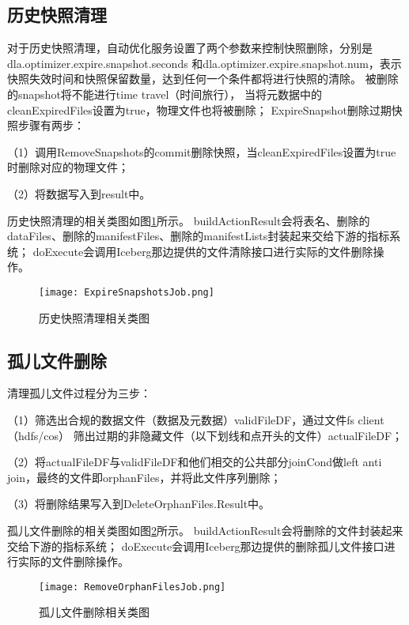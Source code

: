 \subsection{历史快照清理}

对于历史快照清理，自动优化服务设置了两个参数来控制快照删除，分别是dla.optimizer.expire.snapshot.seconds
和dla.optimizer.expire.snapshot.num，表示快照失效时间和快照保留数量，达到任何一个条件都将进行快照的清除。
被删除的snapshot将不能进⾏time travel（时间旅⾏），
当将元数据中的cleanExpiredFiles设置为true，物理⽂件也将被删除；
ExpireSnapshot删除过期快照步骤有两步：

（1）调⽤RemoveSnapshots的commit删除快照，当cleanExpiredFiles设置为true时删除对应的物理⽂件；

（2）将数据写⼊到result中。

历史快照清理的相关类图如图\ref{fig:ExpireSnapshotsJob}所示。
buildActionResult会将表名、删除的dataFiles、删除的manifestFiles、删除的manifestLists封装起来交给下游的指标系统；
doExecute会调用Iceberg那边提供的文件清除接口进行实际的文件删除操作。

\begin{figure}[H]
  \centering
  \texttt{[image: ExpireSnapshotsJob.png]}
  \caption{历史快照清理相关类图}
  \label{fig:ExpireSnapshotsJob}
\end{figure}

\subsection{孤儿文件删除}

清理孤⼉⽂件过程分为三步：

（1）筛选出合规的数据⽂件（数据及元数据）validFileDF，通过⽂件fs client（hdfs/cos）
筛出过期的⾮隐藏⽂件（以下划线和点开头的⽂件）actualFileDF；

（2）将actualFileDF与validFileDF和他们相交的公共部分joinCond做left anti join，最终的⽂件即orphanFiles，并将此⽂件序列删除；

（3）将删除结果写⼊到DeleteOrphanFiles.Result中。

孤儿文件删除的相关类图如图\ref{fig:孤儿文件删除相关类图}所示。
buildActionResult会将删除的文件封装起来交给下游的指标系统；
doExecute会调用Iceberg那边提供的删除孤儿文件接口进行实际的文件删除操作。

\begin{figure}[H]
  \centering
  \texttt{[image: RemoveOrphanFilesJob.png]}
  \caption{孤儿文件删除相关类图}
  \label{fig:孤儿文件删除相关类图}
\end{figure}

